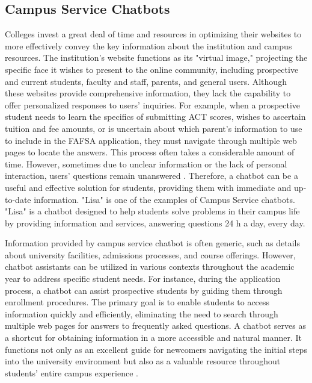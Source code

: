 \documentclass{xum_review}
\begin{document}
\subsection{Campus Service Chatbots}
Colleges invest a great deal of time and resources in optimizing their websites
to more effectively convey the key information about the institution and campus
resources. The institution's website functions as its "virtual image,"
projecting the specific face it wishes to present to the online community,
including prospective and current students, faculty and staff, parents, and
general users. Although these websites provide comprehensive information, they
lack the capability to offer personalized responses to users' inquiries. For
example, when a prospective student needs to learn the specifics of submitting
ACT scores, wishes to ascertain tuition and fee amounts, or is uncertain about
which parent's information to use to include in the FAFSA application, they must
navigate through multiple web pages to locate the answers. This process often
takes a considerable amount of time. However, sometimes due to unclear
information or the lack of personal interaction, users' questions remain
unanswered \citep{neupane2024questions}. Therefore, a chatbot can be a useful and
effective solution for students, providing them with immediate and up-to-date
information. "Lisa" is one of the examples of Campus Service chatbots. "Lisa"
is a chatbot designed to help students solve problems in their campus life by
providing information and services, answering questions 24 h a day, every day. 

Information provided by campus service chatbot is often generic, such as details
about university facilities, admissions processes, and course offerings.
However, chatbot assistants can be utilized in various contexts throughout the
academic year to address specific student needs. For instance, during the
application process, a chatbot can assist prospective students by guiding them
through enrollment procedures. The primary goal is to enable students to access
information quickly and efficiently, eliminating the need to search through
multiple web pages for answers to frequently asked questions. A chatbot serves
as a shortcut for obtaining information in a more accessible and natural manner.
It functions not only as an excellent guide for newcomers navigating the initial
steps into the university environment but also as a valuable resource throughout
students' entire campus experience \citep{dibitonto2018chatbot}. 
\end{document}
